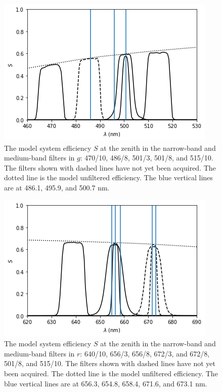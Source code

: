 \begin{figure}
\begin{center}
\includegraphics[width=0.7\linewidth]{figures/huitzi-S-NBMB-g.png}
\medskip
\caption{The model system efficiency $S$ at the zenith in the narrow-band and medium-band filters in $g$: 470/10, 486/8, 501/3, 501/8, and 515/10. The filters shown with dashed lines have not yet been acquired. The dotted line is the model unfiltered efficiency. The blue vertical lines are at 486.1, 495.9, and 500.7 nm.}
\end{center}
\end{figure}

\begin{figure}
\begin{center}
\includegraphics[width=0.7\linewidth]{figures/huitzi-S-NBMB-r.png}
\medskip
\caption{The model system efficiency $S$ at the zenith in the narrow-band and medium-band filters in $r$: 640/10, 656/3, 656/8, 672/3, and 672/8, 501/8, and 515/10. The filters shown with dashed lines have not yet been acquired. The dotted line is the model unfiltered efficiency. The blue vertical lines are at 656.3, 654.8, 658.4, 671.6, and 673.1 nm.}
\end{center}
\end{figure}

